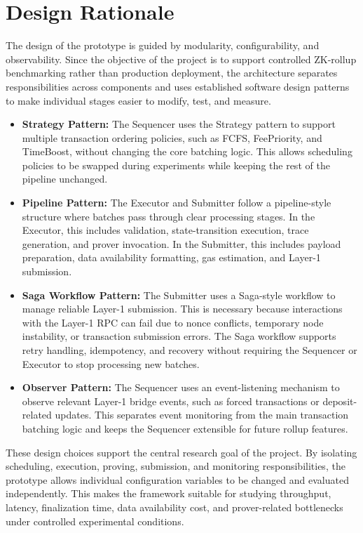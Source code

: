 
\section{Design Rationale}
\label{sec:design_rationale}

The design of the prototype is guided by modularity, configurability, and observability. Since the objective of the project is to support controlled ZK-rollup benchmarking rather than production deployment, the architecture separates responsibilities across components and uses established software design patterns to make individual stages easier to modify, test, and measure.

\begin{itemize}
    \item \textbf{Strategy Pattern:} 
    The Sequencer uses the Strategy pattern to support multiple transaction ordering policies, such as FCFS, FeePriority, and TimeBoost, without changing the core batching logic. This allows scheduling policies to be swapped during experiments while keeping the rest of the pipeline unchanged.

    \item \textbf{Pipeline Pattern:} 
    The Executor and Submitter follow a pipeline-style structure where batches pass through clear processing stages. In the Executor, this includes validation, state-transition execution, trace generation, and prover invocation. In the Submitter, this includes payload preparation, data availability formatting, gas estimation, and Layer-1 submission.

    \item \textbf{Saga Workflow Pattern:} 
    The Submitter uses a Saga-style workflow to manage reliable Layer-1 submission. This is necessary because interactions with the Layer-1 RPC can fail due to nonce conflicts, temporary node instability, or transaction submission errors. The Saga workflow supports retry handling, idempotency, and recovery without requiring the Sequencer or Executor to stop processing new batches.

    \item \textbf{Observer Pattern:} 
    The Sequencer uses an event-listening mechanism to observe relevant Layer-1 bridge events, such as forced transactions or deposit-related updates. This separates event monitoring from the main transaction batching logic and keeps the Sequencer extensible for future rollup features.
\end{itemize}

These design choices support the central research goal of the project. By isolating scheduling, execution, proving, submission, and monitoring responsibilities, the prototype allows individual configuration variables to be changed and evaluated independently. This makes the framework suitable for studying throughput, latency, finalization time, data availability cost, and prover-related bottlenecks under controlled experimental conditions.


